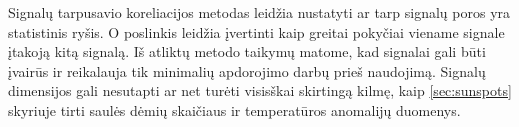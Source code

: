 Signalų tarpusavio koreliacijos metodas leidžia nustatyti ar tarp signalų poros yra statistinis ryšis.
O poslinkis leidžia įvertinti kaip greitai pokyčiai viename signale įtakoją kitą signalą.
Iš atliktų metodo taikymų matome, kad signalai gali būti įvairūs ir reikalauja tik minimalių apdorojimo darbų prieš naudojimą.
Signalų dimensijos gali nesutapti ar net turėti visisškai skirtingą kilmę,
kaip \ref{sec:sunspots} skyriuje tirti saulės dėmių skaičiaus ir temperatūros anomalijų duomenys.
